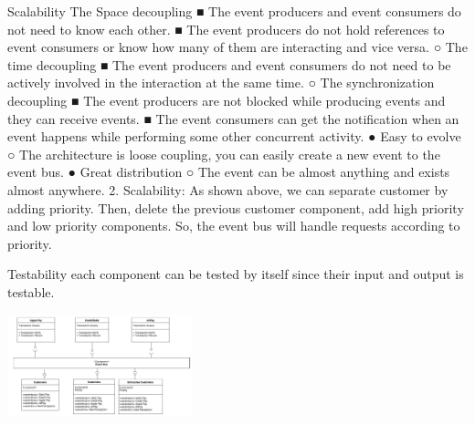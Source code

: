 \begin{nfps}
\item[Scalability] The Space decoupling
■ The event producers and event consumers do not need to know each other.
■ The event producers do not hold references to event consumers or know how many of them are interacting and vice versa.
○ The time decoupling
■ The event producers and event consumers do not need to be actively involved in the interaction at the same time.
○ The synchronization decoupling
■ The event producers are not blocked while producing events and they can receive events.
■ The event consumers can get the notification when an event happens while performing some other concurrent activity.
● Easy to evolve
○ The architecture is loose coupling, you can easily create a new event to the event bus.
● Great distribution
○ The event can be almost anything and exists almost anywhere.
2. Scalability: As shown above, we can separate customer by adding priority. Then, delete the previous customer component, add high priority and low priority components. So, the event bus will handle requests according to priority.

\item[Testability] each component can be tested by itself since their input and
    output is testable.
\end{nfps}

\begin{center}
    \includegraphics[width=0.4\textwidth]{./event-based}
\end{center}
